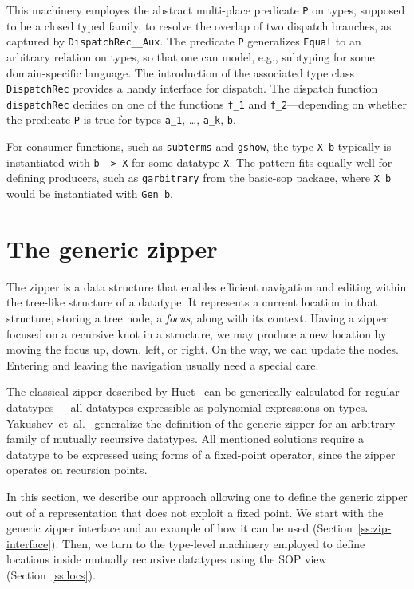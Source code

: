 \documentclass[runningheads]{llncs}
\newcommand{\K}[1]{\lstinline{#1}}
\begin{document}
This machinery employes the abstract multi-place predicate \K{P} on types, supposed to be a closed typed family, to resolve the overlap of two dispatch branches, as captured by \K{DispatchRec__Aux}. The predicate \K{P} generalizes \K{Equal} to an arbitrary relation on types, so that one can model, e.g., subtyping for some domain-specific language. The introduction of the associated type class \K{DispatchRec} provides a handy interface for dispatch. The dispatch function \K{dispatchRec} decides on one of the functions \K{f_1} and \K{f_2}---depending on whether the predicate \K{P} is true for types \K{a_1}, \dots, \K{a_k}, \K{b}.

For consumer functions, such as \K{subterms} and \K{gshow}, the type \K{X b} typically is instantiated with \K{b -> X} for some datatype \K{X}. The pattern fits equally well for defining producers, such as \K{garbitrary} from the \textsf{basic-sop} package, where \K{X b} would be instantiated with \K{Gen b}.


\section{The generic zipper}
\label{sec:generic-zipper}


The zipper is a data structure that enables efficient navigation and editing within the tree-like structure of a datatype. It represents a current location in that structure, storing a tree node, a \emph{focus}, along with its context. Having a zipper focused on a recursive knot in a structure, we may produce a new location by moving the focus up, down, left, or right. On the way, we can update the nodes. Entering and leaving the navigation usually need a special care.

The classical zipper described by Huet~\cite{Huet1997} can be generically calculated for regular datatypes~\cite{HiJeLo2004}---all datatypes expressible as polynomial expressions on types. Yakushev~et~al.~\cite{MuRec2009} generalize the definition of the generic zipper for an arbitrary family of mutually recursive datatypes. All mentioned solutions require a datatype to be expressed using forms of a fixed-point operator, since the zipper operates on recursion points. 

In this section, we describe our approach allowing one to define the generic zipper out of a representation that does not exploit a fixed point. We start with the generic zipper interface and an example of how it can be used (Section~\ref{ss:zip-interface}). Then, we turn to the type-level machinery employed to define locations inside mutually recursive datatypes using the SOP view  (Section~\ref{ss:locs}).
\end{document}
